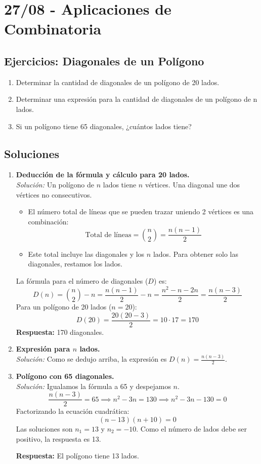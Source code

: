 \documentclass[12pt, letterpaper]{article}
\begin{document}
\section{27/08 - Aplicaciones de Combinatoria}
\subsection{Ejercicios: Diagonales de un Polígono}
\begin{enumerate}
	\item Determinar la cantidad de diagonales de un polígono de 20 lados.
	\item Determinar una expresión para la cantidad de diagonales de un polígono de n lados.
	\item Si un polígono tiene 65 diagonales, ¿cuántos lados tiene?
\end{enumerate}

\subsection{Soluciones}
\begin{enumerate}
	\item \textbf{Deducción de la fórmula y cálculo para 20 lados.} \\
	      \textit{Solución:} Un polígono de $n$ lados tiene $n$ vértices. Una diagonal une dos vértices no consecutivos.
	      \begin{itemize}
		      \item El número total de líneas que se pueden trazar uniendo 2 vértices es una combinación:
		            \[ \text{Total de líneas} = \binom{n}{2} = \frac{n(n-1)}{2} \]
		      \item Este total incluye las diagonales y los $n$ lados. Para obtener solo las diagonales, restamos los lados.
	      \end{itemize}
	      La fórmula para el número de diagonales ($D$) es:
	      \[ D(n) = \binom{n}{2} - n = \frac{n(n-1)}{2} - n = \frac{n^2 - n - 2n}{2} = \frac{n(n-3)}{2} \]
	      Para un polígono de 20 lados ($n=20$):
	      \[ D(20) = \frac{20(20-3)}{2} = 10 \cdot 17 = 170 \]
	      \textbf{Respuesta:} 170 diagonales.

	\item \textbf{Expresión para $n$ lados.} \\
	      \textit{Solución:} Como se dedujo arriba, la expresión es $D(n) = \frac{n(n-3)}{2}$.

	\item \textbf{Polígono con 65 diagonales.} \\
	      \textit{Solución:} Igualamos la fórmula a 65 y despejamos $n$.
	      \[ \frac{n(n-3)}{2} = 65 \implies n^2 - 3n = 130 \implies n^2 - 3n - 130 = 0 \]
	      Factorizando la ecuación cuadrática:
	      \[ (n-13)(n+10) = 0 \]
	      Las soluciones son $n_1 = 13$ y $n_2 = -10$. Como el número de lados debe ser positivo, la respuesta es 13.

	      \textbf{Respuesta:} El polígono tiene 13 lados.
\end{enumerate}
\end{document}

